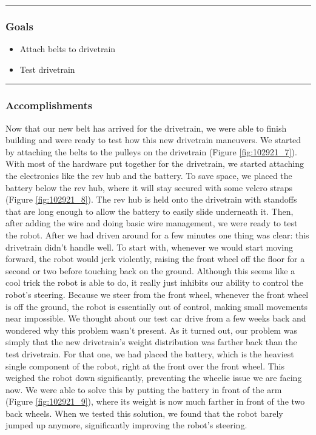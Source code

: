 \noindent\hfil\rule{\textwidth}{.4pt}\hfil
\subsubsection*{Goals}
\begin{itemize}
    \item Attach belts to drivetrain
	\item Test drivetrain


\end{itemize} 

\noindent\hfil\rule{\textwidth}{.4pt}\hfil

\subsubsection*{Accomplishments}
Now that our new belt has arrived for the drivetrain, we were able to finish building and were ready to test how this new drivetrain maneuvers. We started by attaching the belts to the pulleys on the drivetrain (Figure \ref{fig:102921_7}). With most of the hardware put together for the drivetrain, we started attaching the electronics like the rev hub and the battery. To save space, we placed the battery below the rev hub, where it will stay secured with some velcro straps (Figure \ref{fig:102921_8}). The rev hub is held onto the drivetrain with standoffs that are long enough to allow the battery to easily slide underneath it. Then, after adding the wire and doing basic wire management, we were ready to test the robot.
After we had driven around for a few minutes one thing was clear: this drivetrain didn’t handle well. To start with, whenever we would start moving forward, the robot would jerk violently, raising the front wheel off the floor for a second or two before touching back on the ground. Although this seems like a cool trick the robot is able to do, it really just inhibits our ability to control the robot's steering. Because we steer from the front wheel, whenever the front wheel is off the ground, the robot is essentially out of control, making small movements near impossible. We thought about our test car drive from a few weeks back and wondered why this problem wasn’t present. As it turned out, our problem was simply that the new drivetrain’s weight distribution was farther back than the test drivetrain. For that one, we had placed the battery, which is the heaviest single component of the robot, right at the front over the front wheel. This weighed the robot down significantly, preventing the wheelie issue we are facing now. We were able to solve this by putting the battery in front of the arm (Figure \ref{fig:102921_9}), where its weight is now much farther in front of the two back wheels. When we tested this solution, we found that the robot barely jumped up anymore, significantly improving the robot’s steering.
